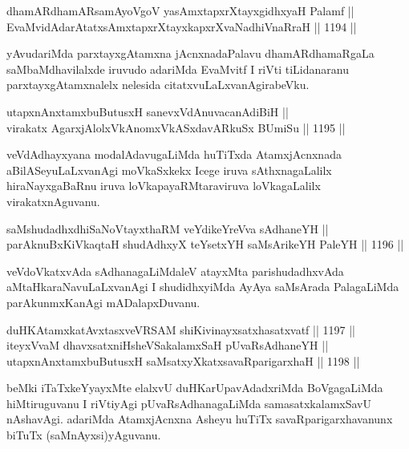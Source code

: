 
\begin{shl}
dhamARdhamARsamAyoVgoV yasAmxtapxrXtayxgidhxyaH Palamf ||  \\
EvaMvidAdarAtatxsAmxtapxrXtayxkapxrXvaNadhiVnaRraH \hfill || 1194 ||  
\end{shl}

\begin{artha}
yAvudariMda parxtayxgAtamxna jAcnxnadaPalavu dhamARdhamaRgaLa saMbaMdhavilalxde iruvudo adariMda EvaMvitf I riVti tiLidanaranu parxtayxgAtamxnalelx nelesida citatxvuLaLxvanAgirabeVku.
\end{artha}

\begin{shl}
utapxnAnxtamxbuButusxH sanevxVdAnuvacanAdiBiH || \\
virakatx AgarxjAlolxVkAnomxVkASxdavARkuSx BUmiSu \hfill || 1195 || 
\end{shl}

\begin{artha}
veVdAdhayxyana modalAdavugaLiMda huTiTxda AtamxjAcnxnada aBilASeyuLaLxvanAgi moVkaSxkekx Icege iruva sAthxnagaLalilx hiraNayxgaBaRnu iruva loVkapayaRMtaraviruva loVkagaLalilx virakatxnAguvanu.
\end{artha}


\begin{shl}
saMshudadhxdhiSaNoV\s tayxthaRM veYdikeYreVva sAdhaneYH || \\
parAknuBxKiVkaqtaH shudAdhxyX teYsetxYH saMsArikeYH PaleYH \hfill || 1196 ||  
\end{shl}

\begin{artha}
veVdoVkatxvAda sAdhanagaLiMdaleV atayxMta parishudadhxvAda aMtaHkaraNavuLaLxvanAgi I shudidhxyiMda AyAya saMsArada PalagaLiMda parAkunmxKanAgi mADalapxDuvanu.
\end{artha}


\begin{shl}
duHKAtamxkatAvxtasxveVRSAM shiKivinayxsatxhasatxvatf \hfill || 1197 ||  \\
iteyxVvaM dhavxsatxniHsheVSakalamxSaH pUvaRsAdhaneYH || \\
utapxnAnxtamxbuButusxH saMsatxyXkatxsavaRparigarxhaH \hfill || 1198 ||  
\end{shl}

\begin{artha}
beMki iTaTxkeYyayxMte elalxvU duHKarUpavAdadxriMda BoVgagaLiMda hiMtiruguvanu I riVtiyAgi pUvaRsAdhanagaLiMda samasatxkalamxSavU nAshavAgi. adariMda AtamxjAcnxna Asheyu huTiTx savaRparigarxhavanunx biTuTx (saMnAyxsi)yAguvanu.
\end{artha}

